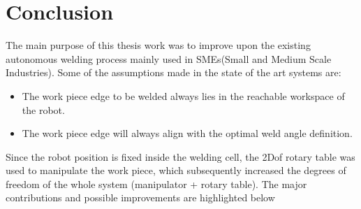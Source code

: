 \section{Conclusion}
\localtableofcontents
The main purpose of this thesis work was to improve upon the existing autonomous welding process mainly used in SMEs(Small and Medium Scale Industries). Some of the assumptions made in the state of the art systems are:
\begin{itemize}
	\item The work piece edge to be welded always lies in the reachable workspace of the robot. 
	\item The work piece edge will always align with the optimal weld angle definition.
\end{itemize}
Since the robot position is fixed inside the welding cell, the 2Dof rotary table was used to manipulate the work piece, which subsequently increased the degrees of freedom of the whole system (manipulator + rotary table). The major contributions and possible improvements are highlighted below 
